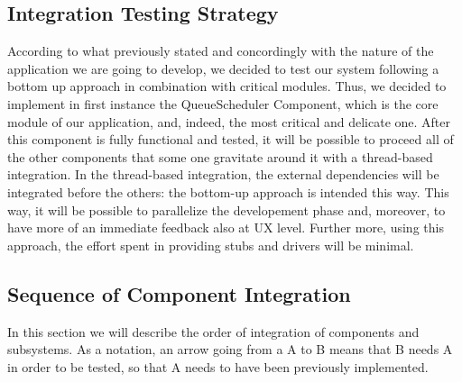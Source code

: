  \subsection{Integration Testing Strategy}
\label{subsect:integrationtestingstrategy}
According to what previously stated and concordingly with the nature of the application we are going to develop, we decided to test our system following a bottom up approach in combination with critical modules.
Thus, we decided to implement in first instance the QueueScheduler Component, which is the core module of our application, and, indeed, the most critical and delicate one. After this component is fully functional and tested, it will be possible to proceed all of the other components that some one gravitate around it with a thread-based integration. In the thread-based integration, the external dependencies will be integrated before the others: the bottom-up approach is intended this way.
This way, it will be possible to parallelize the developement phase and, moreover, to have more of an immediate feedback also at UX level. Further more, using this approach, the effort spent in providing stubs and drivers will be minimal.

\subsection{Sequence of Component Integration}
\label{subsect:integrationtestingstrategy}
In this section we will describe the order of integration of components and subsystems.
As a notation, an arrow going from a A to B means that B needs A in order to be tested, so that A needs to have been previously implemented.

